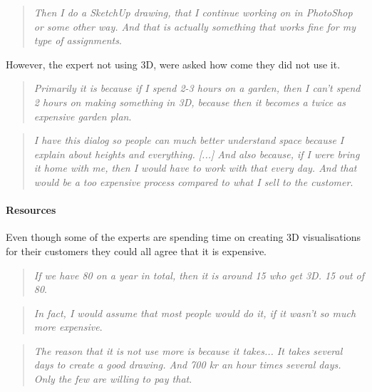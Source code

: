 		\begin{quote}
			\textit{Then I do a SketchUp drawing, that I continue working on in PhotoShop or some other way. And that is actually something that works fine for my type of assignments}\label{def:expertQuote6}.\\
		\end{quote}
		However, the expert not using 3D, were asked how come they did not use it.
		\begin{quote}
			\textit{Primarily it is because if I spend 2-3 hours on a garden, then I can't spend 2 hours on making something in 3D, because then it becomes a twice as expensive garden plan}\label{def:expertQuote7}.\\
		\end{quote}
		\begin{quote}
			\textit{I have this dialog so people can much better understand space because I explain about heights and everything. [...] And also because, if I were bring it home with me, then I would have to work with that every day. And that would be a too expensive process compared to what I sell to the customer}\label{def:expertQuote8}.\\
		\end{quote}
		
		\paragraph*{Resources}
		Even though some of the experts are spending time on creating 3D visualisations for their customers they could all agree that it is expensive.
		\begin{quote}
			\textit{If we have 80 on a year in total, then it is around 15 who get 3D. 15 out of 80}\label{def:expertQuote10}.\\
		\end{quote}
		
		\begin{quote}
			\textit{In fact, I would assume that most people would do it, if it wasn't so much more expensive}\label{def:expertQuote9}.\\
		\end{quote}

		\begin{quote}
			\textit{The reason that it is not use more is because it takes... It takes several days to create a good drawing. And 700 kr an hour times several days. Only the few are willing to pay that}\label{def:expertQuote11}.\\
		\end{quote}
		
